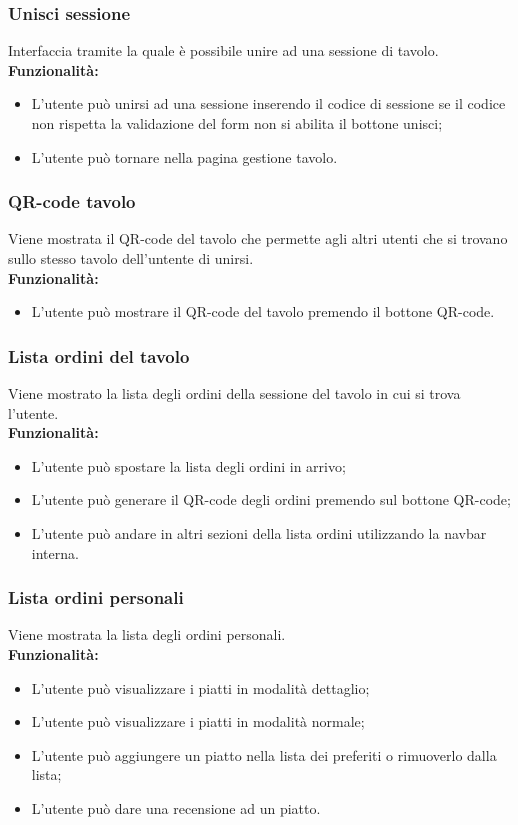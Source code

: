 \subsubsection{Unisci sessione}
Interfaccia tramite la quale è possibile unire ad una sessione di tavolo.\\
\textbf{Funzionalità:}
\begin{itemize}
    \item L'utente può  unirsi ad una sessione inserendo il codice di sessione se il codice non rispetta la validazione del form non si abilita il bottone unisci;
    \item L'utente può tornare nella pagina gestione tavolo.
\end{itemize}


\subsubsection{QR-code tavolo}
Viene mostrata il QR-code del tavolo che permette agli altri utenti che si trovano sullo stesso tavolo dell'untente di unirsi.\\
\textbf{Funzionalità:}
\begin{itemize}
    \item L'utente può mostrare il QR-code del tavolo premendo il bottone QR-code.
\end{itemize}


\subsubsection{Lista ordini del tavolo}
Viene mostrato la lista degli ordini della sessione del tavolo in cui si trova l'utente.\\
\textbf{Funzionalità:}
\begin{itemize}
    \item L'utente può spostare la lista degli ordini in arrivo;
    \item L'utente può generare il QR-code degli ordini premendo sul bottone QR-code;
    \item L'utente può andare in altri sezioni della lista ordini utilizzando la navbar interna.
\end{itemize}

\subsubsection{Lista ordini personali}
Viene mostrata la lista degli ordini personali.\\
\textbf{Funzionalità:}
\begin{itemize}
    \item L'utente può visualizzare i piatti in modalità dettaglio;
    \item L'utente può visualizzare i piatti in modalità normale;
    \item L'utente può aggiungere un piatto nella lista dei preferiti o rimuoverlo dalla lista;
    \item L'utente può dare una recensione ad un piatto.
\end{itemize}


